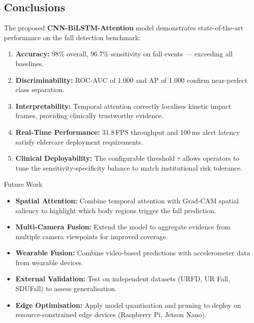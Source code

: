 \documentclass[12pt,a4paper]{article}
\begin{document}
\subsection{Conclusions}

The proposed \textbf{CNN-BiLSTM-Attention} model demonstrates state-of-the-art performance on the fall detection benchmark:
\begin{enumerate}[itemsep=4pt]
    \item \textbf{Accuracy:} 98\% overall, 96.7\% sensitivity on fall events — exceeding all baselines.
    \item \textbf{Discriminability:} ROC-AUC of 1.000 and AP of 1.000 confirm near-perfect class separation.
    \item \textbf{Interpretability:} Temporal attention correctly localises kinetic impact frames, providing clinically trustworthy evidence.
    \item \textbf{Real-Time Performance:} 31.8\,FPS throughput and 100\,ms alert latency satisfy eldercare deployment requirements.
    \item \textbf{Clinical Deployability:} The configurable threshold $\tau$ allows operators to tune the sensitivity-specificity balance to match institutional risk tolerance.
\end{enumerate}

\begin{keybox}{Future Work}
\begin{itemize}[itemsep=2pt]
    \item \textbf{Spatial Attention:} Combine temporal attention with Grad-CAM spatial saliency to highlight which body regions trigger the fall prediction.
    \item \textbf{Multi-Camera Fusion:} Extend the model to aggregate evidence from multiple camera viewpoints for improved coverage.
    \item \textbf{Wearable Fusion:} Combine video-based predictions with accelerometer data from wearable devices.
    \item \textbf{External Validation:} Test on independent datasets (URFD, UR Fall, SDUFall) to assess generalisation.
    \item \textbf{Edge Optimisation:} Apply model quantisation and pruning to deploy on resource-constrained edge devices (Raspberry Pi, Jetson Nano).
\end{itemize}
\end{keybox}

\end{document}
